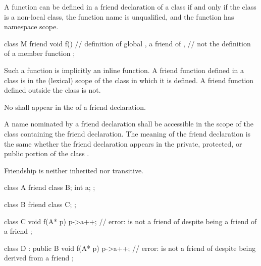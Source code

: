 \pnum
{}%
A function can be defined in a friend declaration of a class if and only if the
class is a non-local class, the function name is unqualified,
and the function has namespace scope.
\begin{example}

\begin{codeblock}
class M {
  friend void f() { }           // definition of global , a friend of ,
                                // not the definition of a member function
};
\end{codeblock}
\end{example}

\pnum
Such a function is implicitly an inline function.
A friend
function defined in a class is in the (lexical) scope of the class in which it is defined.
A friend function defined outside the class is not.

\pnum
No
shall appear in the
of a friend declaration.

\pnum
{}%
A name nominated by a friend declaration shall be accessible in the scope of the
class containing the friend declaration.
The meaning of the friend declaration is the same whether the friend declaration
appears in the private, protected, or public
portion of the class
.

\pnum
{}%
Friendship is neither inherited nor transitive.
\begin{example}

\begin{codeblock}
class A {
  friend class B;
  int a;
};

class B {
  friend class C;
};

class C  {
  void f(A* p) {
    p->a++;         // error:  is not a friend of  despite being a friend of a friend
  }
};

class D : public B  {
  void f(A* p) {
    p->a++;         // error:  is not a friend of  despite being derived from a friend
  }
};
\end{codeblock}
\end{example}

